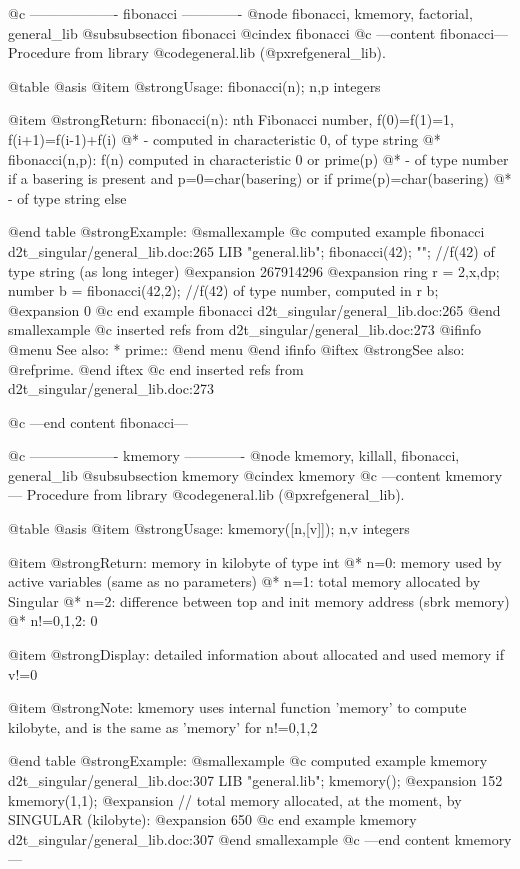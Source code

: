 @c ------------------- fibonacci -------------
@node fibonacci, kmemory, factorial, general_lib
@subsubsection fibonacci
@cindex fibonacci
@c ---content fibonacci---
Procedure from library @code{general.lib} (@pxref{general_lib}).

@table @asis
@item @strong{Usage:}
fibonacci(n); n,p integers

@item @strong{Return:}
fibonacci(n): nth Fibonacci number, f(0)=f(1)=1, f(i+1)=f(i-1)+f(i)
@* - computed in characteristic 0, of type string
@* fibonacci(n,p): f(n) computed in characteristic 0 or prime(p)
@* - of type number if a basering is present and p=0=char(basering)
or if prime(p)=char(basering)
@* - of type string else

@end table
@strong{Example:}
@smallexample
@c computed example fibonacci d2t_singular/general_lib.doc:265 
LIB "general.lib";
fibonacci(42); "";             //f(42) of type string (as long integer)
@expansion{} 267914296
@expansion{} 
ring r = 2,x,dp;
number b = fibonacci(42,2);    //f(42) of type number, computed in r
b;
@expansion{} 0
@c end example fibonacci d2t_singular/general_lib.doc:265
@end smallexample
@c inserted refs from d2t_singular/general_lib.doc:273
@ifinfo
@menu
See also:
* prime::
@end menu
@end ifinfo
@iftex
@strong{See also:}
@ref{prime}.
@end iftex
@c end inserted refs from d2t_singular/general_lib.doc:273

@c ---end content fibonacci---

@c ------------------- kmemory -------------
@node kmemory, killall, fibonacci, general_lib
@subsubsection kmemory
@cindex kmemory
@c ---content kmemory---
Procedure from library @code{general.lib} (@pxref{general_lib}).

@table @asis
@item @strong{Usage:}
kmemory([n,[v]]); n,v integers

@item @strong{Return:}
memory in kilobyte of type int
@* n=0: memory used by active variables (same as no parameters)
@* n=1: total memory allocated by Singular
@* n=2: difference between top and init memory address (sbrk memory)
@* n!=0,1,2: 0

@item @strong{Display:}
detailed information about allocated and used memory if v!=0

@item @strong{Note:}
kmemory uses internal function 'memory' to compute kilobyte, and
is the same as 'memory' for n!=0,1,2

@end table
@strong{Example:}
@smallexample
@c computed example kmemory d2t_singular/general_lib.doc:307 
LIB "general.lib";
kmemory();
@expansion{} 152
kmemory(1,1);
@expansion{} // total memory allocated, at the moment, by SINGULAR (kilobyte):
@expansion{} 650
@c end example kmemory d2t_singular/general_lib.doc:307
@end smallexample
@c ---end content kmemory---

